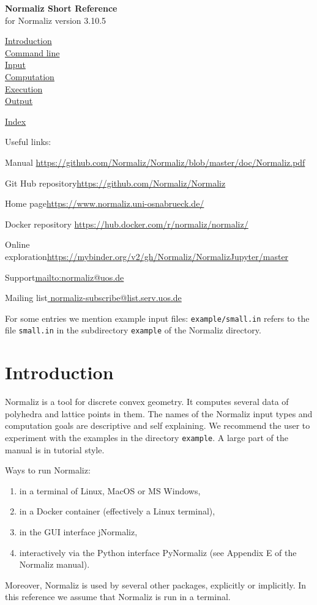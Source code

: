 \documentclass[12pt,a4paper]{scrartcl}
\theoremstyle{definition}
\def\ttt{\texttt}
\def\version{3.10.5}
\def\ContLine#1{\hyperref[#1]{\large #1}\\[6pt]}
\def\SectStart#1{\section{#1}\label{#1}\def\SectHead{#1}}
\def\example#1{\enspace\ttt{\color{blue}example/#1.in}}
\begin{document}
\vspace*{2cm}

\renewcommand{\indexname}{Index\label{Index}}


\label{Top}
\begin{center}
\Large\textbf{Normaliz Short Reference}\\[12pt] for Normaliz version \version
\end{center}

\ContLine{Introduction}
\ContLine{Command line}
\ContLine{Input}
\ContLine{Computation}
\ContLine{Execution}
\ContLine{Output}
\medskip

\ContLine{Index}

\bigskip

Useful links:\medskip

Manual \enspace \url{https://github.com/Normaliz/Normaliz/blob/master/doc/Normaliz.pdf}\smallskip

Git Hub repository\enspace \url{https://github.com/Normaliz/Normaliz}\smallskip

Home page\enspace \url{https://www.normaliz.uni-osnabrueck.de/}\smallskip

Docker repository \url{https://hub.docker.com/r/normaliz/normaliz/}\smallskip

Online exploration\enspace	\url{https://mybinder.org/v2/gh/Normaliz/NormalizJupyter/master}\smallskip

Support\enspace 	\url{mailto:normaliz@uos.de} \smallskip

Mailing list\enspace \url{ normaliz-subscribe@list.serv.uos.de}

\bigskip\bigskip

For some entries we mention example input files: \example{small} refers to the file \verb|small.in| in the subdirectory \verb|example| of the Normaliz directory.

\newpage

\SectStart{Introduction}

Normaliz is a tool for discrete convex geometry. It computes several data of polyhedra and lattice points in them. The names of the Normaliz input types and computation goals are descriptive and self explaining. We recommend the user to experiment with the examples in  the directory \verb|example|. A large part of the manual is in tutorial style.

Ways to run Normaliz:
\begin{enumerate}
\item in a terminal of Linux, MacOS or MS Windows,
\item in a Docker container (effectively a Linux terminal),
\item in the GUI interface jNormaliz,
\item interactively via the Python interface PyNormaliz (see Appendix E of the Normaliz manual).
\end{enumerate}
Moreover, Normaliz is used by several other packages, explicitly or implicitly. In this reference we assume that Normaliz is run in a terminal.
\end{document}
